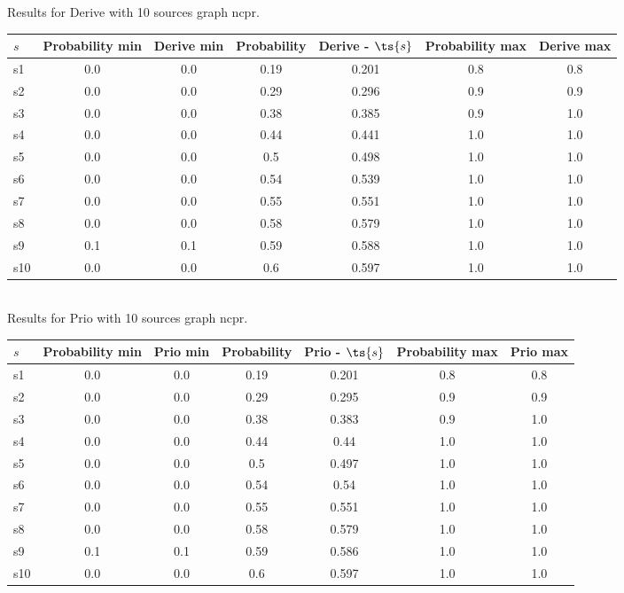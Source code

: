 \documentclass{article}
\begin{document}
\noindent Results for Derive with 10 sources graph ncpr.

\noindent\begin{tabular}{|l|c|c|c|c|c|c|}
\hline
$s$& Probability min & Derive min & Probability & Derive - $\ts{s}$ & Probability max & Derive max\\
\hline
s1 &0.0 & 0.0 & 0.19 & 0.201 & 0.8 & 0.8\\
\hline
s2 &0.0 & 0.0 & 0.29 & 0.296 & 0.9 & 0.9\\
\hline
s3 &0.0 & 0.0 & 0.38 & 0.385 & 0.9 & 1.0\\
\hline
s4 &0.0 & 0.0 & 0.44 & 0.441 & 1.0 & 1.0\\
\hline
s5 &0.0 & 0.0 & 0.5 & 0.498 & 1.0 & 1.0\\
\hline
s6 &0.0 & 0.0 & 0.54 & 0.539 & 1.0 & 1.0\\
\hline
s7 &0.0 & 0.0 & 0.55 & 0.551 & 1.0 & 1.0\\
\hline
s8 &0.0 & 0.0 & 0.58 & 0.579 & 1.0 & 1.0\\
\hline
s9 &0.1 & 0.1 & 0.59 & 0.588 & 1.0 & 1.0\\
\hline
s10 &0.0 & 0.0 & 0.6 & 0.597 & 1.0 & 1.0\\
\hline
\end{tabular}\\

\noindent Results for Prio with 10 sources graph ncpr.

\noindent\begin{tabular}{|l|c|c|c|c|c|c|}
\hline
$s$& Probability min & Prio min & Probability & Prio - $\ts{s}$ & Probability max & Prio max\\
\hline
s1 &0.0 & 0.0 & 0.19 & 0.201 & 0.8 & 0.8\\
\hline
s2 &0.0 & 0.0 & 0.29 & 0.295 & 0.9 & 0.9\\
\hline
s3 &0.0 & 0.0 & 0.38 & 0.383 & 0.9 & 1.0\\
\hline
s4 &0.0 & 0.0 & 0.44 & 0.44 & 1.0 & 1.0\\
\hline
s5 &0.0 & 0.0 & 0.5 & 0.497 & 1.0 & 1.0\\
\hline
s6 &0.0 & 0.0 & 0.54 & 0.54 & 1.0 & 1.0\\
\hline
s7 &0.0 & 0.0 & 0.55 & 0.551 & 1.0 & 1.0\\
\hline
s8 &0.0 & 0.0 & 0.58 & 0.579 & 1.0 & 1.0\\
\hline
s9 &0.1 & 0.1 & 0.59 & 0.586 & 1.0 & 1.0\\
\hline
s10 &0.0 & 0.0 & 0.6 & 0.597 & 1.0 & 1.0\\
\hline
\end{tabular}\\
\end{document}
